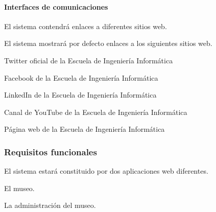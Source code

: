 
\paragraph*{Interfaces de comunicaciones}
\begin{myEnumIC}
	\item El sistema contendrá enlaces a diferentes sitios web.
	\item El sistema mostrará por defecto enlaces a los siguientes sitios web.
	\begin{myEnumIC}
		\item Twitter oficial de la Escuela de Ingeniería Informática
		\item Facebook de la Escuela de Ingeniería Informática
		\item LinkedIn de la Escuela de Ingeniería Informática
		\item Canal de YouTube de la Escuela de Ingeniería Informática
		\item Página web de la Escuela de Ingeniería Informática
	\end{myEnumIC}
\end{myEnumIC}


\subsubsection{Requisitos funcionales}
\begin{myEnumRF}
	\item El sistema estará constituido por dos aplicaciones web diferentes.
	\begin{myEnumRF}
		\item El museo.
		\item La administración del museo.
	\end{myEnumRF}
\end{myEnumRF}

